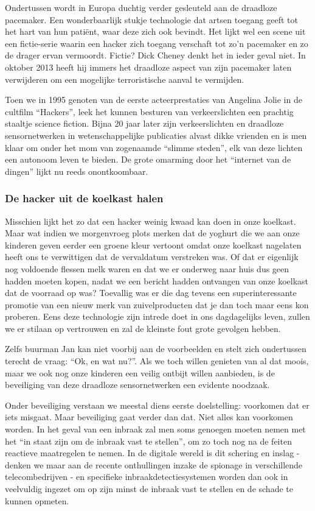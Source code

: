 \documentclass[DIV=calc,paper=a4,fontsize=11pt,twocolumn]{scrartcl}
\newcommand{\heading}[1]{
\subsubsection*{#1}
\vspace{-2mm}
}
\begin{document}
Ondertussen wordt in Europa duchtig verder gesleuteld aan de draadloze
pacemaker. Een wonderbaarlijk stukje technologie dat artsen toegang geeft tot
het hart van hun pati\"ent, waar deze zich ook bevindt. Het lijkt wel een scene
uit een fictie-serie waarin een hacker zich toegang verschaft tot zo'n
pacemaker en zo de drager ervan vermoordt. Fictie? Dick Cheney denkt het in
ieder geval niet. In oktober 2013 heeft hij immers het draadloze aspect van
zijn pacemaker laten verwijderen om een mogelijke terroristische aanval te
vermijden.

Toen we in 1995 genoten van de eerste acteerprestaties van Angelina Jolie in de
cultfilm ``Hackers'', leek het kunnen besturen van verkeerslichten een prachtig
staaltje science fiction. Bijna 20 jaar later zijn verkeerslichten en draadloze
sensornetwerken in wetenschappelijke publicaties alvast dikke vrienden en is
men klaar om onder het mom van zogenaamde ``slimme steden'', elk van deze
lichten een autonoom leven te bieden. De grote omarming door het ``internet van
de dingen'' lijkt nu reeds onontkoombaar.

\heading{De hacker uit de koelkast halen}

Misschien lijkt het zo dat een hacker weinig kwaad kan doen in onze koelkast.
Maar wat indien we morgenvroeg plots merken dat de yoghurt die we aan onze
kinderen geven eerder een groene kleur vertoont omdat onze koelkast nagelaten
heeft ons te verwittigen dat de vervaldatum verstreken was. Of dat er eigenlijk
nog voldoende flessen melk waren en dat we er onderweg naar huis dus geen
hadden moeten kopen, nadat we een bericht hadden ontvangen van onze koelkast
dat de voorraad op was? Toevallig was er die dag tevens een superinteressante
promotie van een nieuw merk van zuivelproducten dat je dan toch maar eens kon
proberen. Eens deze technologie zijn intrede doet in ons dagdagelijks leven,
zullen we er stilaan op vertrouwen en zal de kleinste fout grote gevolgen
hebben.

Zelfs buurman Jan kan niet voorbij aan de voorbeelden en stelt zich ondertussen
terecht de vraag: ``Ok, en wat nu?''. Als we toch willen genieten van al dat
moois, maar we ook nog onze kinderen een veilig ontbijt willen aanbieden, is de
beveiliging van deze draadloze sensornetwerken een evidente noodzaak.

Onder beveiliging verstaan we meestal diens eerste doelstelling: voorkomen dat
er iets misgaat. Maar beveiliging gaat verder dan dat. Niet alles kan voorkomen
worden. In het geval van een inbraak zal men soms genoegen moeten nemen met het
``in staat zijn om de inbraak vast te stellen'', om zo toch nog na de feiten
reactieve maatregelen te nemen. In de digitale wereld is dit schering en inslag
- denken we maar aan de recente onthullingen inzake de spionage in
verschillende telecombedrijven - en specifieke inbraakdetectiesystemen worden
dan ook in veelvuldig ingezet om op zijn minst de inbraak vast te stellen en de
schade te kunnen opmeten.
\end{document}
